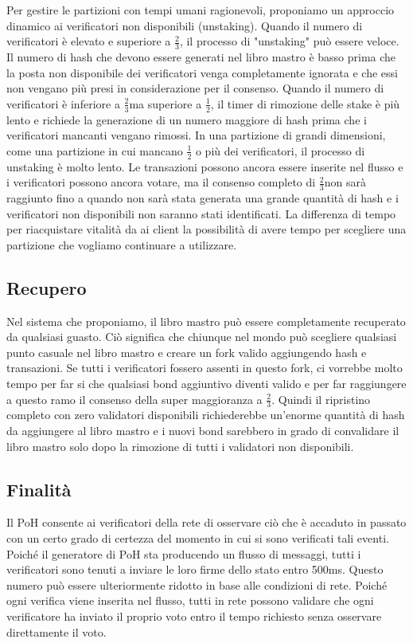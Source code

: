 \documentclass[12pt]{article}
\begin{document}
Per gestire le partizioni con tempi umani ragionevoli, proponiamo un approccio dinamico ai verificatori non disponibili (unstaking). Quando il numero di verificatori è elevato e superiore a \(\frac{2}{3}\), il processo di "unstaking" può essere veloce. Il numero di hash che devono essere generati nel libro mastro è basso prima che la posta non disponibile dei verificatori venga completamente ignorata e che essi non vengano più presi in considerazione per il consenso. Quando il numero di verificatori è inferiore a \(\frac{2}{3}\)ma superiore a \(\frac{1}{2}\), il timer di rimozione delle stake è più lento e richiede la generazione di un numero maggiore di hash prima che i verificatori mancanti vengano rimossi. In una partizione di grandi dimensioni, come una partizione in cui mancano \(\frac{1}{2}\) o più dei verificatori, il processo di unstaking è molto lento. Le transazioni possono ancora essere inserite nel flusso e i verificatori possono ancora votare, ma il consenso completo di \(\frac{2}{3}\)non sarà raggiunto fino a quando non sarà stata generata una grande quantità di hash e i verificatori non disponibili non saranno stati identificati. La differenza di tempo per riacquistare vitalità da ai client la possibilità di avere tempo per scegliere una partizione che vogliamo continuare a utilizzare.

\subsection{Recupero}\label{availability}
Nel sistema che proponiamo, il libro mastro può essere completamente recuperato da qualsiasi guasto. Ciò significa che chiunque nel mondo può scegliere qualsiasi punto casuale nel libro mastro e creare un fork valido aggiungendo hash e transazioni. Se tutti i verificatori fossero assenti in questo fork, ci vorrebbe molto tempo per far si che qualsiasi bond aggiuntivo diventi valido e  per far raggiungere a questo ramo il consenso della super maggioranza a \(\frac{2}{3}\). Quindi il ripristino completo con zero validatori disponibili richiederebbe un'enorme quantità di hash da aggiungere al libro mastro e i nuovi bond sarebbero in grado di convalidare il libro mastro solo dopo la rimozione di tutti i validatori non disponibili.

\subsection{Finalità}\label{availability}
Il PoH consente ai verificatori della rete di osservare ciò che è accaduto in passato con un certo grado di certezza del momento in cui si sono verificati tali eventi. Poiché il generatore di PoH sta producendo un flusso di messaggi, tutti i verificatori sono tenuti a inviare le loro firme dello stato entro 500ms. Questo numero può essere ulteriormente ridotto in base alle condizioni di rete. Poiché ogni verifica viene inserita nel flusso, tutti in rete possono validare che ogni verificatore ha inviato il proprio voto entro il tempo richiesto senza osservare direttamente il voto.
\end{document}
